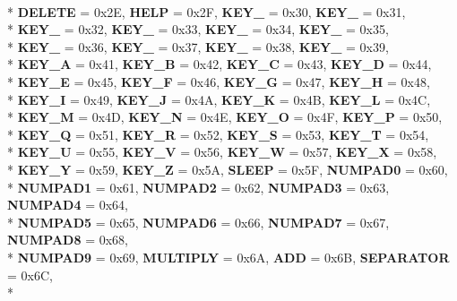 \begin{DoxyCompactItemize}
\\*
{\bfseries D\-E\-L\-E\-T\-E} = 0x2\-E, 
{\bfseries H\-E\-L\-P} = 0x2\-F, 
{\bfseries K\-E\-Y\-\_} = 0x30, 
{\bfseries K\-E\-Y\-\_} = 0x31, 
\\*
{\bfseries K\-E\-Y\-\_} = 0x32, 
{\bfseries K\-E\-Y\-\_} = 0x33, 
{\bfseries K\-E\-Y\-\_} = 0x34, 
{\bfseries K\-E\-Y\-\_} = 0x35, 
\\*
{\bfseries K\-E\-Y\-\_} = 0x36, 
{\bfseries K\-E\-Y\-\_} = 0x37, 
{\bfseries K\-E\-Y\-\_} = 0x38, 
{\bfseries K\-E\-Y\-\_} = 0x39, 
\\*
{\bfseries K\-E\-Y\-\_\-\-A} = 0x41, 
{\bfseries K\-E\-Y\-\_\-\-B} = 0x42, 
{\bfseries K\-E\-Y\-\_\-\-C} = 0x43, 
{\bfseries K\-E\-Y\-\_\-\-D} = 0x44, 
\\*
{\bfseries K\-E\-Y\-\_\-\-E} = 0x45, 
{\bfseries K\-E\-Y\-\_\-\-F} = 0x46, 
{\bfseries K\-E\-Y\-\_\-\-G} = 0x47, 
{\bfseries K\-E\-Y\-\_\-\-H} = 0x48, 
\\*
{\bfseries K\-E\-Y\-\_\-\-I} = 0x49, 
{\bfseries K\-E\-Y\-\_\-\-J} = 0x4\-A, 
{\bfseries K\-E\-Y\-\_\-\-K} = 0x4\-B, 
{\bfseries K\-E\-Y\-\_\-\-L} = 0x4\-C, 
\\*
{\bfseries K\-E\-Y\-\_\-\-M} = 0x4\-D, 
{\bfseries K\-E\-Y\-\_\-\-N} = 0x4\-E, 
{\bfseries K\-E\-Y\-\_\-\-O} = 0x4\-F, 
{\bfseries K\-E\-Y\-\_\-\-P} = 0x50, 
\\*
{\bfseries K\-E\-Y\-\_\-\-Q} = 0x51, 
{\bfseries K\-E\-Y\-\_\-\-R} = 0x52, 
{\bfseries K\-E\-Y\-\_\-\-S} = 0x53, 
{\bfseries K\-E\-Y\-\_\-\-T} = 0x54, 
\\*
{\bfseries K\-E\-Y\-\_\-\-U} = 0x55, 
{\bfseries K\-E\-Y\-\_\-\-V} = 0x56, 
{\bfseries K\-E\-Y\-\_\-\-W} = 0x57, 
{\bfseries K\-E\-Y\-\_\-\-X} = 0x58, 
\\*
{\bfseries K\-E\-Y\-\_\-\-Y} = 0x59, 
{\bfseries K\-E\-Y\-\_\-\-Z} = 0x5\-A, 
{\bfseries S\-L\-E\-E\-P} = 0x5\-F, 
{\bfseries N\-U\-M\-P\-A\-D0} = 0x60, 
\\*
{\bfseries N\-U\-M\-P\-A\-D1} = 0x61, 
{\bfseries N\-U\-M\-P\-A\-D2} = 0x62, 
{\bfseries N\-U\-M\-P\-A\-D3} = 0x63, 
{\bfseries N\-U\-M\-P\-A\-D4} = 0x64, 
\\*
{\bfseries N\-U\-M\-P\-A\-D5} = 0x65, 
{\bfseries N\-U\-M\-P\-A\-D6} = 0x66, 
{\bfseries N\-U\-M\-P\-A\-D7} = 0x67, 
{\bfseries N\-U\-M\-P\-A\-D8} = 0x68, 
\\*
{\bfseries N\-U\-M\-P\-A\-D9} = 0x69, 
{\bfseries M\-U\-L\-T\-I\-P\-L\-Y} = 0x6\-A, 
{\bfseries A\-D\-D} = 0x6\-B, 
{\bfseries S\-E\-P\-A\-R\-A\-T\-O\-R} = 0x6\-C, 
\\*

\end{DoxyCompactItemize}

